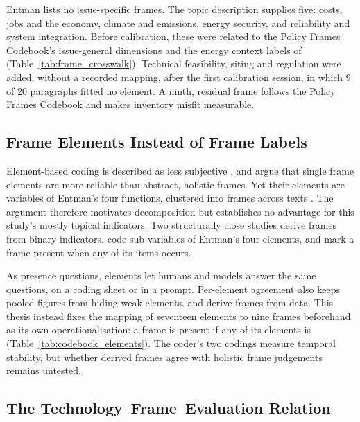 Entman lists no issue-specific frames. The topic description supplies five: costs, jobs and the economy, climate and emissions, energy security, and reliability and system integration. Before calibration, these were related to the Policy Frames Codebook's issue-general dimensions \parencite{boydstun2020policyframes,card2015mediaframes} and the energy context labels of \textcite{toetzke2022energydiscourse} (Table~\ref{tab:frame_crosswalk}). Technical feasibility, siting and regulation were added, without a recorded mapping, after the first calibration session, in which 9 of 20 paragraphs fitted no element. A ninth, residual frame follows the Policy Frames Codebook and makes inventory misfit measurable.

\subsection{Frame Elements Instead of Frame Labels}\label{subsec:frame_elements}

Element-based coding is described as less subjective \parencite[p.~3]{ali2025hydrogenframing}, and \textcite[p.~264]{matthes2008contentanalysis} argue that single frame elements are more reliable than abstract, holistic frames. Yet their elements are variables of Entman's four functions, clustered into frames across texts \parencite[pp.~263--264]{matthes2008contentanalysis}. The argument therefore motivates decomposition but establishes no advantage for this study's mostly topical indicators. Two structurally close studies derive frames from binary indicators. \textcite[p.~7]{ali2025hydrogenframing} code sub-variables of Entman's four elements, and \textcite[p.~987]{liu2023strategyframing} mark a frame present when any of its items occurs.

As presence questions, elements let humans and models answer the same questions, on a coding sheet or in a prompt. Per-element agreement also keeps pooled figures from hiding weak elements. \textcite{matthes2008contentanalysis} and \textcite{ali2025hydrogenframing} derive frames from data. This thesis instead fixes the mapping of seventeen elements to nine frames beforehand as its own operationalisation: a frame is present if any of its elements is (Table~\ref{tab:codebook_elements}). The coder's two codings measure temporal stability, but whether derived frames agree with holistic frame judgements remains untested.

\subsection{The Technology--Frame--Evaluation Relation}\label{subsec:relation}\label{subsec:domain_background}

